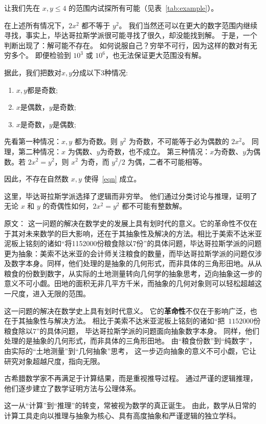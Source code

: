 让我们先在 $x,y\le 4$ 的范围内试探所有可能（见表~\ref{tab:example}）。

在上述所有情况下，$2x^2$ 都不等于 $y^2$。  
我们当然还可以在更大的数字范围内继续寻找，事实上，毕达哥拉斯学派很可能寻找了很久，却没能找到解。
于是，一个判断出现了：解可能不存在。  
如何说服自己？穷举不可行，因为这样的数对有无穷多个。  
即便检验到 $10^3$ 或 $10^6$，也无法保证更大范围没有解。

据此，我们把数对$x,y$分成以下3种情况:
\begin{enumerate}
\item $x,y$都是奇数;
\item $x$是偶数，$y$是奇数;
\item $x$是奇数，$y$是偶数;

\end{enumerate}

先看第一种情况：$x,y$ 都为奇数。则 $y^2$ 为奇数，不可能等于必为偶数的 $2x^2$。  
同理，第二种情况：$x$ 为偶数、$y$为奇数，也不成立。  
第三种情况：$x$为奇数、$y$为偶数。若 $2x^2=y^2$，则 $x^2$ 为奇，而 $y^2/2$ 为偶，二者不可能相等。

因此，不存在自然数 $x,y$ 使得~\eqref{eqn} 成立。

这里，毕达哥拉斯学派选择了逻辑而非穷举。  
他们通过分类讨论与推理，证明了无论 $x$ 和 $y$ 的奇偶性如何，$2x^2=y^2$ 都不可能有整数解。

原文：
这一问题的解决在数学史的发展上具有划时代的意义。它的革命性不仅在于其对未来数学的巨大影响，还在于其抽象性及解决的方法。相比于美索不达米亚泥板上铭刻的诸如“将1152000份粮食除以7份”的具体问题，毕达哥拉斯学派的问题更为抽象：美索不达米亚的会计师关注粮食的数量，而毕达哥拉斯学派的问题仅涉及数字本身。同样，他们处理的是抽象的几何形式，而非具体的三角形田地。从从粮食的份数到数字，从实际的土地测量转向几何学的抽象思考，迈向抽象这一步的意义不可小觑。田地的面积无非几平方千米，而抽象的几何对象则可以轻松超越这一尺度，进入无限的范围。

这一问题的解决在数学史上具有划时代意义。  
它的{\bf 革命性}不仅在于影响广泛，也在于其抽象性与解决方法。  
相比于美索不达米亚泥板上铭刻的诸如“把~$1152000$份粮食除以7”的具体问题，  
毕达哥拉斯学派的问题面向抽象数字本身。  
同样，他们处理的是抽象的几何形式，而非具体的三角形田地。
由“粮食份数”到“纯数字”，由实际的“土地测量”到“几何抽象”思考，  
这一步迈向抽象的意义不可小觑，它让研究对象超越尺度，指向无限。

古希腊数学家不再满足于计算结果，而是重视推导过程。  
通过严谨的逻辑推理，他们逐步建立了数学证明方法与公理体系。

这一从“计算”到“推理”的转变，常被视为数学的真正诞生。  
由此，数学从日常的计算工具走向以推理与抽象为核心、具有高度抽象和严谨逻辑的独立学科。

